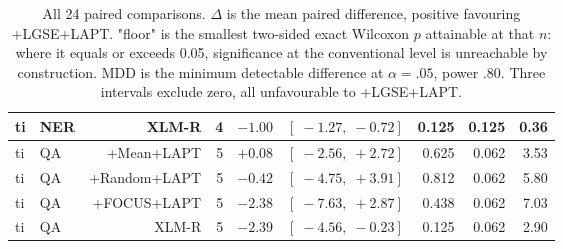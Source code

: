 \documentclass[11pt]{article}
\begin{document}
\begin{table}[t]
\begin{tabular}{llrrrrrrr}
ti & NER & XLM-R        & 4 & $-1.00$ & $[\;-1.27, \;-0.72]$ & 0.125 & 0.125 & 0.36 \\
\midrule
ti & QA  & +Mean+LAPT   & 5 & $+0.08$ & $[\;-2.56, \;+2.72]$ & 0.625 & 0.062 & 3.53 \\
ti & QA  & +Random+LAPT & 5 & $-0.42$ & $[\;-4.75, \;+3.91]$ & 0.812 & 0.062 & 5.80 \\
ti & QA  & +FOCUS+LAPT  & 5 & $-2.38$ & $[\;-7.63, \;+2.87]$ & 0.438 & 0.062 & 7.03 \\
ti & QA  & XLM-R        & 5 & $-2.39$ & $[\;-4.56, \;-0.23]$ & 0.125 & 0.062 & 2.90 \\
\bottomrule
\end{tabular}
\caption{All 24 paired comparisons. $\Delta$ is the mean paired difference,
positive favouring +LGSE+LAPT. "floor" is the smallest two-sided exact
Wilcoxon $p$ attainable at that $n$: where it equals or exceeds 0.05,
significance at the conventional level is unreachable by construction. MDD is
the minimum detectable difference at $\alpha = .05$, power $.80$. Three
intervals exclude zero, all unfavourable to +LGSE+LAPT.}
\label{tab:allpaired}
\end{table}
\end{document}

